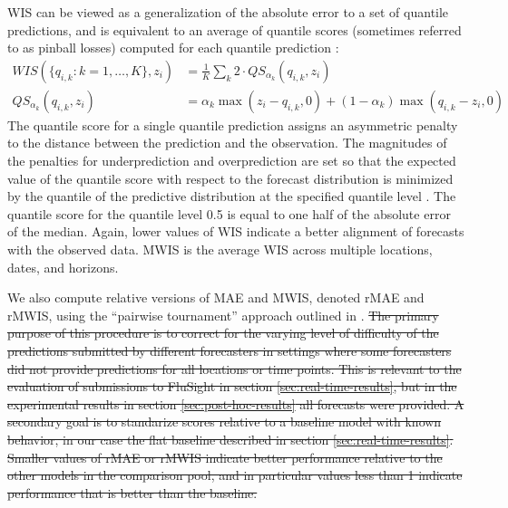 \documentclass{article}\usepackage[]{graphicx}\usepackage[]{xcolor}
\providecommand{\DIFdeltex}[1]{{\protect\color{red}\sout{#1}}}                      %
\providecommand{\DIFdelbegin}{} %
\providecommand{\DIFdel}[1]{\texorpdfstring{\DIFdeltex{#1}}{}} %
\newcommand{\DIFscaledelfig}{0.5}
\newlength{\DIFdelgraphicswidth} %
\newlength{\DIFdelgraphicsheight} %
\newcommand{\DIFdelincludegraphics}[2][]{%
\sbox{\DIFdelgraphicsbox}{\DIFOincludegraphics[#1]{#2}}%
\settoboxwidth{\DIFdelgraphicswidth}{\DIFdelgraphicsbox} %
\settoboxtotalheight{\DIFdelgraphicsheight}{\DIFdelgraphicsbox} %
\scalebox{\DIFscaledelfig}{%
\parbox[b]{\DIFdelgraphicswidth}{\usebox{\DIFdelgraphicsbox}\\[-\baselineskip] \rule{\DIFdelgraphicswidth}{0em}}\llap{\resizebox{\DIFdelgraphicswidth}{\DIFdelgraphicsheight}{%
\setlength{\unitlength}{\DIFdelgraphicswidth}%
\begin{picture}(1,1)%
\thicklines\linethickness{2pt} %
{\color[rgb]{1,0,0}\put(0,0){\framebox(1,1){}}}%
{\color[rgb]{1,0,0}\put(0,0){\line( 1,1){1}}}%
{\color[rgb]{1,0,0}\put(0,1){\line(1,-1){1}}}%
\end{picture}%
}\hspace*{3pt}}} %
} %
\DeclareRobustCommand{\DIFdelbegin}{\DIFOdelbegin \let\includegraphics\DIFdelincludegraphics} %
\begin{document}
WIS can be viewed as a generalization of the absolute error to a set of quantile predictions, and is equivalent to an average of quantile scores (sometimes referred to as pinball losses) computed for each quantile prediction \cite{bracher2021WIS}:
\begin{align*}
WIS(\{q_{i,k}: k = 1, \ldots, K\}, z_{i}) &= \frac{1}{K} \sum_k 2 \cdot QS_{\alpha_k}(q_{i,k}, z_{i}) \\
QS_{\alpha_k}(q_{i,k}, z_{i}) &= \alpha_k \max(z_{i} - q_{i,k}, 0) + (1 - \alpha_k) \max(q_{i,k} - z_{i}, 0)
\end{align*}
The quantile score for a single quantile prediction assigns an asymmetric penalty to the distance between the prediction and the observation. The magnitudes of the penalties for underprediction and overprediction are set so that the expected value of the quantile score with respect to the forecast distribution is minimized by the quantile of the predictive distribution at the specified quantile level \cite{Gneiting2011quantilesoptimalpoint}. The quantile score for the quantile level 0.5 is equal to one half of the absolute error of the median. Again, lower values of WIS indicate a better alignment of forecasts with the observed data. MWIS is the average WIS across multiple locations, dates, and horizons.

We also compute relative versions of MAE and MWIS, denoted rMAE and rMWIS, using the ``pairwise tournament'' approach outlined in \cite{cramer2022covidMortalityForecasts}. \DIFdelbegin \DIFdel{The primary purpose of this procedure is to correct for the varying level of difficulty of the predictions submitted by different forecasters in settings where some forecasters did not provide predictions for all locations or time points. This is relevant to the evaluation of submissions to FluSight in section \ref{sec:real-time-results}, but in the experimental results in section \ref{sec:post-hoc-results} all forecasts were provided. A secondary goal is to standarize scores relative to a baseline model with known behavior, in our case the flat baseline described in section \ref{sec:real-time-results}. Smaller values of rMAE or rMWIS indicate better performance relative to the other models in the comparison pool, and in particular values less than 1 indicate performance that is better than the baseline.
}%
\end{document}
